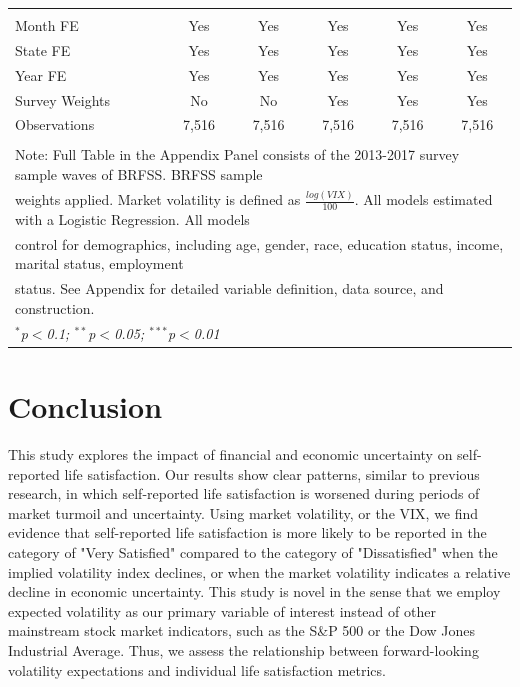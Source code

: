 \documentclass[11pt,a4paper,oldfontcommands]{memoir}
\begin{document}
{\begin{footnotesize}
\begin{longtable}{l*{5}{c}}
\hline \\[-1.8ex] 
Month FE  & Yes & Yes & Yes & Yes & Yes \\ 
State FE  & Yes & Yes & Yes & Yes & Yes \\ 
Year FE  & Yes & Yes & Yes & Yes & Yes \\ 
Survey Weights & No & No & Yes & Yes & Yes\\ 
Observations  & 7,516 & 7,516 & 7,516 & 7,516 & 7,516 \\ 
\hline \\[-1.8ex] 
\multicolumn{6}{l}{Note: Full Table in the Appendix Panel consists of the 2013-2017 survey sample waves of BRFSS. BRFSS sample}\\
\multicolumn{6}{l}{weights applied. Market volatility is defined as $\frac{log(VIX)}{100}$. All models estimated with a Logistic Regression. All models}\\
\multicolumn{6}{l}{control for demographics, including age, gender, race, education status, income, marital status, employment}\\
\multicolumn{6}{l}{status. See Appendix for detailed variable definition, data source, and construction.}\\
\multicolumn{6}{l}{\textit{$^{*}$p$<$0.1; $^{**}$p$<$0.05; $^{***}$p$<$0.01}} \\ 
\hline\hline

\end{longtable} 

\section{Conclusion}

This study explores the impact of financial and economic uncertainty on self-reported life satisfaction. Our results show clear patterns, similar to previous research, in which self-reported life satisfaction is worsened during periods of market turmoil and uncertainty. Using market volatility, or the VIX, we find evidence that self-reported life satisfaction is more likely to be reported in the category of "Very Satisfied" compared to the category of "Dissatisfied" when the implied volatility index declines, or when the market volatility indicates a relative decline in economic uncertainty. This study is novel in the sense that we employ expected volatility as our primary variable of interest instead of other mainstream stock market indicators, such as the S&P 500 or the Dow Jones Industrial Average. Thus, we assess the relationship between forward-looking volatility expectations and individual life satisfaction metrics.


\end{footnotesize}}
\end{document}
